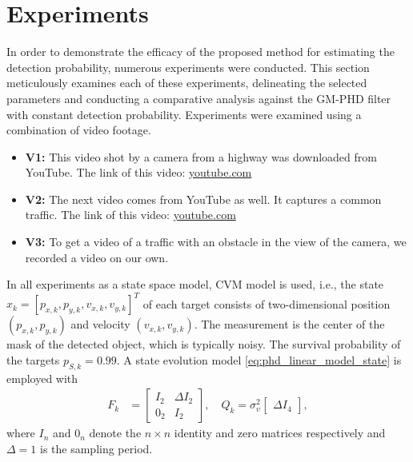 \chapter{Experiments}
\label{sec:experiments}
In order to demonstrate the efficacy of the proposed method for estimating the detection probability, numerous experiments were conducted. This section meticulously examines each of these experiments, delineating the selected parameters and conducting a comparative analysis against the GM-PHD filter with constant detection probability.
Experiments were examined using a combination of video footage.
\begin{itemize}
  \item \textbf{V1:} This video shot by a camera from a highway was downloaded from YouTube. The link of this video: \href{https://www.youtube.com/watch?v=KBsqQez-O4w&t=30s&ab_channel=NickMartinez}{youtube.com}
  \item \textbf{V2:} The next video comes from YouTube as well. It captures a common traffic. The link of this video: \href{https://www.youtube.com/watch?v=7WFYiZersNc&ab_channel=AbdulMunaim}{youtube.com}
  \item \textbf{V3:} To get a video of a traffic with an obstacle in the view of the camera, we recorded a video on
  our own.
\end{itemize}

In all experiments as a state space model, CVM model is used, i.e., the state $x_k = [p_{x,k},p_{y,k},v_{x,k},v_{y,k}]^T$ of each target consists of two-dimensional position $(p_{x,k},p_{y,k})$ and velocity $(v_{x,k},v_{y,k})$. The measurement is the center of the mask of the detected object, which is typically noisy. The survival probability of the targets $p_{S,k} = 0.99$. A state evolution model \eqref{eq:phd_linear_model_state} is employed with
\begin{align}
  F_k &=
  \begin{bmatrix}
    I_2 & \Delta I_2 \\
    0_2 & I_2
  \end{bmatrix},
  \quad
  Q_k = \sigma_{\upsilon}^2
  \begin{bmatrix}
    \Delta I_4
  \end{bmatrix},
\end{align}
where $I_n$ and $0_n$ denote the $n\times n$ identity and zero matrices respectively and $\Delta = 1$ is the sampling
period.

